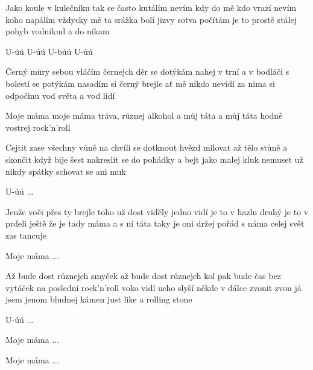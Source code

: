 \resetVars
{}
\MakeHeader
\Lyrics

Jako koule v kulečníku tak se často kutálím
nevím kdy do mě kdo vrazí nevím  koho napálím
vždycky mě ta srážka bolí jizvy sotva počítám
je to prostě stálej pohyb vodnikud a do nikam

U-úú U-úú U-búú U-úú

Černý můry sebou vláčím černejch děr se dotýkám
nahej v trní a v bodláčí s bolestí se potýkám
nasadím si černý brejle ať mě nikdo nevidí
za nima si odpočinu vod světa a vod lidí

Moje máma moje máma tráva, různej alkohol
a můj táta a můj táta hodně vostrej rock'n'roll

Cejtit zase všechny vůně na chvíli se dotknout hvězd
milovat až tělo stůně a skončit když bije šest
nakreslit se do pohádky a bejt jako malej kluk
nemuset už nikdy spátky schovat se ani muk

U-úú ...

Jenže voči přes ty brejle toho už dost viděly
jedno vidí je to v hazlu druhý je to v prdeli
ještě že je tady máma a s ní táta taky je
oni držej pořád s náma celej svět zas tancuje

Moje máma ...

Až bude dost různejch smyček až bude dost různejch kol
pak bude čas bez vytáček na poslední rock'n'roll
voko vidí ucho slyší někde v dálce zvonit zvon
já jsem jenom bludnej kámen just like a rolling stone

U-úú ...

Moje máma ...

Moje máma ...

\Next
